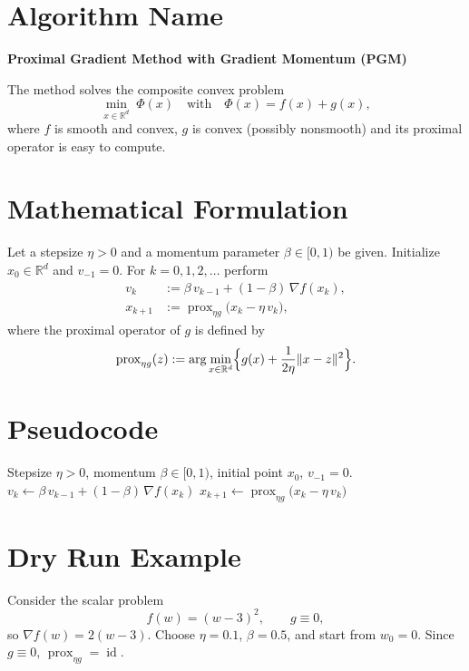 \documentclass{article}
\newcommand{\prox}{\operatorname{prox}}
\newcommand{\grad}{\nabla}
\newcommand{\R}{\mathbb{R}}
\begin{document}
\section*{Algorithm Name}
\textbf{Proximal Gradient Method with Gradient Momentum (PGM)}  

The method solves the composite convex problem  
\[
\min_{x\in\R^{d}}\; \Phi(x)\quad\text{with}\quad \Phi(x)=f(x)+g(x),
\]
where $f$ is smooth and convex, $g$ is convex (possibly nonsmooth) and its proximal operator is easy to compute.

\section*{Mathematical Formulation}
Let a stepsize $\eta>0$ and a momentum parameter $\beta\in[0,1)$ be given.
Initialize $x_{0}\in\R^{d}$ and $v_{-1}=0$.  
For $k=0,1,2,\dots$ perform
\begin{align}
v_{k}      &:=\beta\,v_{k-1}+(1-\beta)\,\grad f(x_{k}) ,\label{eq:momentum}\\[4pt]
x_{k+1}    &:=\prox_{\eta g}\!\bigl(x_{k}-\eta\,v_{k}\bigr),\label{eq:proxstep}
\end{align}
where the proximal operator of $g$ is defined by  
\[
\prox_{\eta g}(z):=\arg\min_{x\in\R^{d}}\Bigl\{ g(x)+\frac{1}{2\eta}\|x-z\|^{2}\Bigr\}.
\]

\section*{Pseudocode}
\begin{algorithm}[H]
\caption{Proximal Gradient with Momentum (PGM)}
\begin{algorithmic}[1]
\Require Stepsize $\eta>0$, momentum $\beta\in[0,1)$, initial point $x_{0}$, $v_{-1}=0$.
    \State $v_{k}\gets \beta\,v_{k-1}+(1-\beta)\,\grad f(x_{k})$ 
    \State $x_{k+1}\gets \prox_{\eta g}\!\bigl(x_{k}-\eta\,v_{k}\bigr)$ 
\EndFor
\end{algorithmic}
\end{algorithm}

\section*{Dry Run Example}
Consider the scalar problem  
\[
f(w)=(w-3)^{2},\qquad g\equiv0,
\]
so $\grad f(w)=2(w-3)$.  
Choose $\eta=0.1$, $\beta=0.5$, and start from $w_{0}=0$.
Since $g\equiv0$, $\prox_{\eta g}= \operatorname{id}$.
\end{document}
